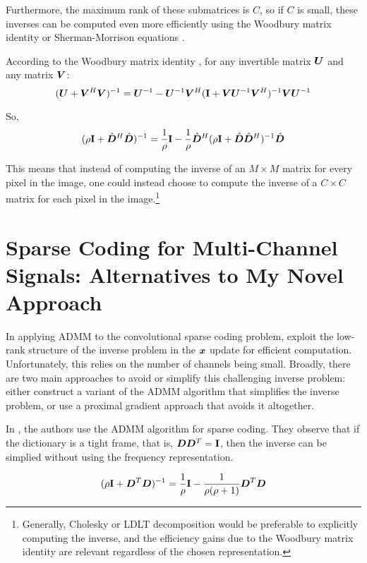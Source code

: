 Furthermore, the maximum rank of these submatrices is $C$, so if $C$ is small, these inverses can be computed even more efficiently using the Woodbury matrix identity or Sherman-Morrison equations \cite{vsorel2016fast} \cite{heide2015fast} \cite{wohlberg2015efficient}.

According to the Woodbury matrix identity \cite{henderson1981deriving}, for any invertible matrix $\bm{U}$ and any matrix $\bm{V}$:
\begin{equation}
(\bm{U} + \bm{V}^H\bm{V})^{-1} = \bm{U}^{-1} - \bm{U}^{-1}\bm{V}^H({\bf I} + \bm{V}\bm{U}^{-1}\bm{V}^H)^{-1}\bm{V}\bm{U}^{-1}
\end{equation}

So,
\begin{equation}
(\rho{\bf I} + \hat{\bm{D}}^H\hat{\bm{D}})^{-1} = \frac{1}{\rho}{\bf I} - \frac{1}{\rho}\hat{\bm{D}}^H(\rho{\bf I} + \hat{\bm{D}}\hat{\bm{D}}^H)^{-1}\hat{\bm{D}}
\end{equation}

This means that instead of computing the inverse of an $M \times M$ matrix for every pixel in the image, one could instead choose to compute the inverse of a $C \times C$ matrix for each pixel in the image.\footnote{Generally, Cholesky or LDLT decomposition would be preferable to explicitly computing the inverse, and the efficiency gains due to the Woodbury matrix identity are relevant regardless of the chosen representation.}

\section{Sparse Coding for Multi-Channel Signals: Alternatives to My Novel Approach}
In applying ADMM to the convolutional sparse coding problem, \cite{vsorel2016fast} \cite{heide2015fast} \cite{wohlberg2015efficient} exploit the low-rank structure of the inverse problem in the $\bm{x}$ update for efficient computation. Unfortunately, this relies on the number of channels being small. Broadly, there are two main approaches to avoid or simplify this challenging inverse problem: either construct a variant of the ADMM algorithm that simplifies the inverse problem, or use a proximal gradient approach that avoids it altogether.

In \cite{chodosh2018deep}\cite{murdock2018deep}, the authors use the ADMM algorithm for sparse coding. They observe that if the dictionary is a tight frame, that is, $\bm{D}\bm{D}^T = {\bf I}$, then the inverse can be simplied without using the frequency representation.

\begin{equation}
(\rho{\bf I} + \bm{D}^T\bm{D})^{-1} = \frac{1}{\rho}{\bf I} - \frac{1}{\rho(\rho + 1)}\bm{D}^T\bm{D}
\end{equation}

